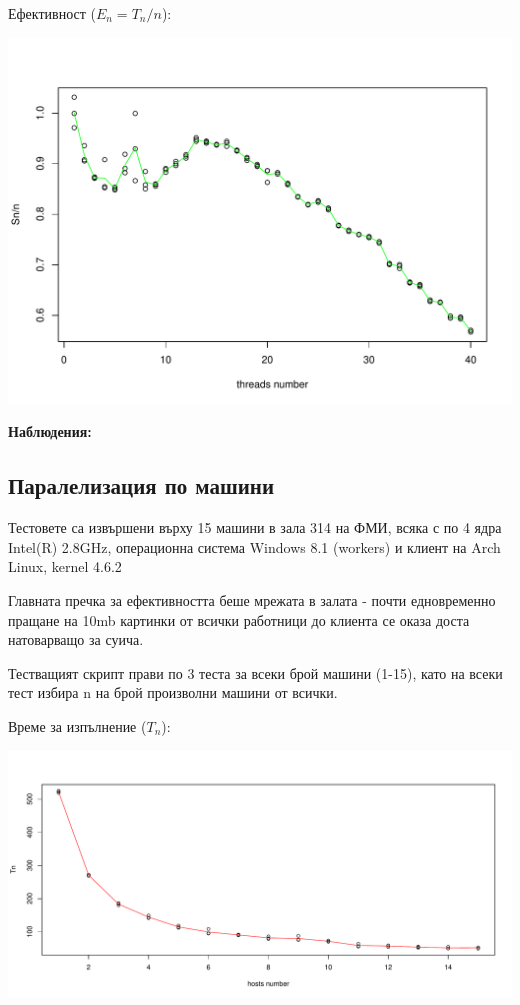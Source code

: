 \documentclass[12pt]{extarticle}
\begin{document}
Ефективност ($E_n = T_n / n$):
\begin{center}
\includegraphics[width=\textwidth]{thread_graphs/Sn_n.pdf}
\end{center}

\textbf{Наблюдения:} 


\subsection{Паралелизация по машини}
Тестовете са извършени върху 15 машини в зала 314 на ФМИ,
всяка с по 4 ядра Intel(R) 2.8GHz, операционна система Windows 8.1
(workers) и клиент на Arch Linux, kernel 4.6.2

Главната пречка за ефективността беше мрежата в залата - почти
едновременно пращане на 10mb картинки от всички работници до клиента
се оказа доста натоварващо за суича.

Тестващият скрипт прави по 3 теста за всеки брой машини (1-15),
като на всеки тест избира n на брой произволни машини от всички.

\vspace{5mm}
Време за изпълнение ($T_n$):
\begin{center}
\includegraphics[width=\textwidth]{host_graphs/Tn.pdf}
\end{center}
\end{document}
